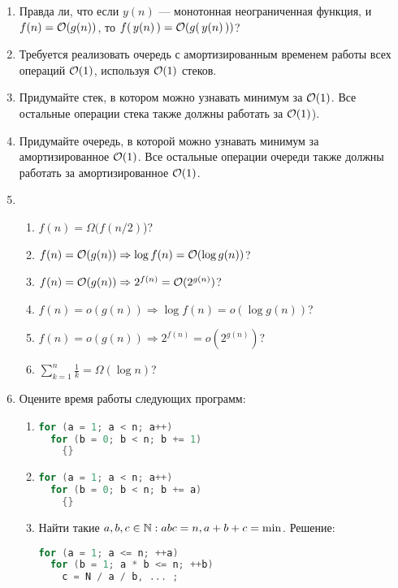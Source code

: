 \begin{enumerate}
  \item Правда ли, что если $y(n)$ --- монотонная
    неограниченная функция, и $f(n) = \mathcal{O}(g(n))$, то
    $f(\,y(n)\,) = \mathcal{O}(g(\,y(n)\,))$?

  \item
    Требуется реализовать очередь с амортизированным временем работы всех операций $\mathcal{O}(1)$, используя $\mathcal{O}(1)$ стеков.
    
  \item
    Придумайте стек, в котором можно узнавать минимум за $\mathcal{O}(1)$. Все
    остальные операции стека также должны работать за $\mathcal{O}(1)$).

  \item
    Придумайте очередь, в которой можно узнавать минимум за
    амортизированное $\mathcal{O}(1)$. Все остальные операции очереди также
    должны работать за амортизированное $\mathcal{O}(1)$.

  \item
    \begin{enumerate}
      \item $f(n) = \Omega(f(n \slash 2)$)?
      \item $f(n) = \mathcal{O}(g(n)) \Rightarrow \log f(n) = \mathcal{O}(\log g(n))$?
      \item $f(n) = \mathcal{O}(g(n)) \Rightarrow 2^{f(n)} = \mathcal{O}(2^{g(n)})$?
      \item $f(n) = o(g(n)) \Rightarrow \log f(n) = o(\log g(n))$?
      \item $f(n) = o(g(n)) \Rightarrow 2^{f(n)} = o(2^{g(n)})$?
      \item $\sum_{k = 1}^n \frac{1}{k} = \Omega(\log n)$?
    \end{enumerate}
    
  \item
    Оцените время работы следующих программ:
    \begin{enumerate}
      \item
\begin{lstlisting}[language=C, frame=single]
for (a = 1; a < n; a++)
  for (b = 0; b < n; b += 1)
    {}
\end{lstlisting}

      \item
\begin{lstlisting}[language=C, frame=single]
for (a = 1; a < n; a++)
  for (b = 0; b < n; b += a)
    {}
\end{lstlisting}

      \item Найти такие $a, b, c \in \mathbb{N}: a b c = n, a+b+c = \min$. Решение:
\begin{lstlisting}[language=C, frame=single]
for (a = 1; a <= n; ++a)
  for (b = 1; a * b <= n; ++b)
    c = N / a / b, ... ;
\end{lstlisting}


\end{enumerate}
\end{enumerate}
